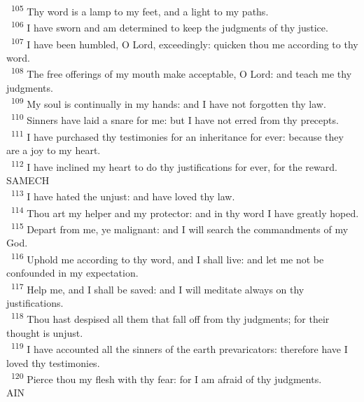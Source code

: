 \documentclass[a5paper,12pt]{article}
\begin{document}
\begin{multicols*}{2}
~\textsuperscript{105} Thy word is a lamp to my feet, and a light to my paths.\\
~\textsuperscript{106} I have sworn and am determined to keep the judgments of thy justice.\\
~\textsuperscript{107} I have been humbled, O Lord, exceedingly: quicken thou me according to thy word.\\
~\textsuperscript{108} The free offerings of my mouth make acceptable, O Lord: and teach me thy judgments.\\
~\textsuperscript{109} My soul is continually in my hands: and I have not forgotten thy law.\\
~\textsuperscript{110} Sinners have laid a snare for me: but I have not erred from thy precepts.\\
~\textsuperscript{111} I have purchased thy testimonies for an inheritance for ever: because they are a joy to my heart.\\
~\textsuperscript{112} I have inclined my heart to do thy justifications for ever, for the reward.\\

SAMECH\\

~\textsuperscript{113} I have hated the unjust: and have loved thy law.\\
~\textsuperscript{114} Thou art my helper and my protector: and in thy word I have greatly hoped.\\
~\textsuperscript{115} Depart from me, ye malignant: and I will search the commandments of my God.\\
~\textsuperscript{116} Uphold me according to thy word, and I shall live: and let me not be confounded in my expectation.\\
~\textsuperscript{117} Help me, and I shall be saved: and I will meditate always on thy justifications.\\
~\textsuperscript{118} Thou hast despised all them that fall off from thy judgments; for their thought is unjust.\\
~\textsuperscript{119} I have accounted all the sinners of the earth prevaricators: therefore have I loved thy testimonies.\\
~\textsuperscript{120} Pierce thou my flesh with thy fear: for I am afraid of thy judgments.\\

AIN\\


\end{multicols*}
\end{document}
